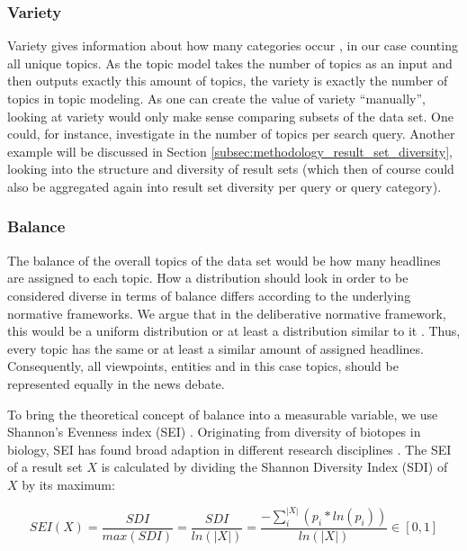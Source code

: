 \subsubsection{Variety} %
\label{subsec:methodology_data_set_diversity_variety}
Variety gives information about how many categories occur \citep{macarthur_patterns_1965}, in our case counting all unique topics. 
As the topic model takes the number of topics as an input and then outputs exactly this amount of topics, the variety is exactly the number of topics in topic modeling. As one can create the value of variety ``manually'', looking at variety would only make sense comparing subsets of the data set. 
One could, for instance, investigate in the number of topics per search query. 
Another example will be discussed in Section \ref{subsec:methodology_result_set_diversity}, looking into the structure and diversity of result sets (which then of course could also be aggregated again into result set diversity per query or query category).

\subsubsection{Balance} %
\label{subsec:methodology_data_set_diversity_balance}
The balance of the overall topics of the data set would be how many headlines are assigned to each topic. How a distribution should look in order to be considered diverse in terms of balance differs according to the underlying normative frameworks.
We argue that in the deliberative normative framework, this would be a uniform distribution or at least a distribution similar to it \citep{loecherbach_unified_2020}. Thus, every topic has the same or at least a similar amount of assigned headlines. Consequently, all viewpoints, entities and in this case topics, should be represented equally in the news debate.

To bring the theoretical concept of balance into a measurable variable, we use 
Shannon's Evenness index (SEI) \citep{loecherbach_unified_2020}. 
Originating from diversity of biotopes in biology, SEI has found broad adaption in different research disciplines \citep{van_dam_diversity_2019}. 
The SEI of a result set $X$ is calculated by dividing the Shannon Diversity Index (SDI) of $X$ by its maximum:

\[SEI(X) = \frac{SDI}{max(SDI)} = \frac{SDI}{ln(|X|)} = \frac{-\sum_{i}^{|X|}(p_i * ln(p_i))}{ln(|X|)} \in [0,1]\]

